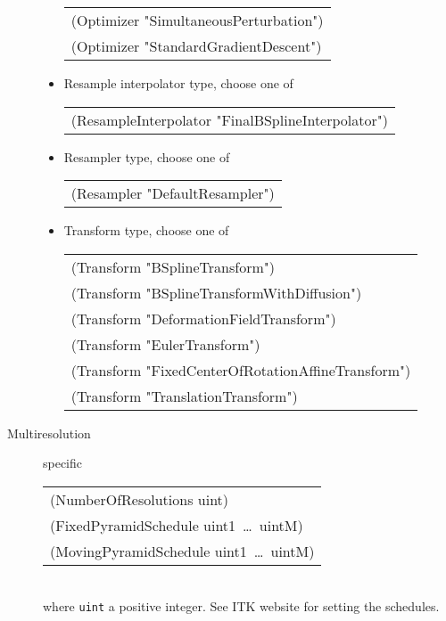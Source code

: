 \documentclass[a4paper]{article}
\newenvironment{Tabular}[1]{\ttfamily \begin{tabular}{#1}}{\end{tabular}}
\begin{document}
\begin{description}
\begin{itemize}
\begin{Tabular}{l}
        (Optimizer "SimultaneousPerturbation") \\
        (Optimizer "StandardGradientDescent")
        \end{Tabular}
    \item Resample interpolator type, choose one of\\
        \begin{Tabular}{l}
        (ResampleInterpolator "FinalBSplineInterpolator")
        \end{Tabular}
    \item Resampler type, choose one of\\
        \begin{Tabular}{l}
        (Resampler "DefaultResampler")
        \end{Tabular}
    \item Transform type, choose one of\\
        \begin{Tabular}{l}
        (Transform "BSplineTransform") \\
        (Transform "BSplineTransformWithDiffusion") \\
        (Transform "DeformationFieldTransform") \\
        (Transform "EulerTransform") \\
        (Transform "FixedCenterOfRotationAffineTransform") \\
        (Transform "TranslationTransform")
        \end{Tabular}
    \end{itemize}

\item[Multiresolution] specific\\
    \begin{Tabular}{l}
    (NumberOfResolutions uint) \\
    (FixedPyramidSchedule uint1~\ldots~uintM) \\
    (MovingPyramidSchedule uint1~\ldots~uintM)
    \end{Tabular}\\
where \texttt{uint} a positive integer. See ITK website for setting the schedules.


\end{description}
\end{document}
